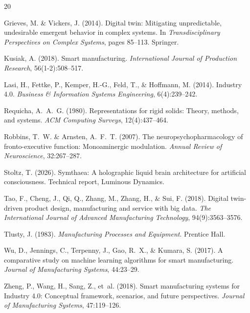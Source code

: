 \documentclass[11pt,a4paper]{article}
\begin{document}

\begin{thebibliography}{20}

Grieves, M. \& Vickers, J. (2014).
\newblock Digital twin: Mitigating unpredictable, undesirable emergent behavior in complex systems.
\newblock In \emph{Transdisciplinary Perspectives on Complex Systems}, pages 85--113. Springer.

Kusiak, A. (2018).
\newblock Smart manufacturing.
\newblock \emph{International Journal of Production Research}, 56(1-2):508--517.

Lasi, H., Fettke, P., Kemper, H.-G., Feld, T., \& Hoffmann, M. (2014).
\newblock Industry 4.0.
\newblock \emph{Business \& Information Systems Engineering}, 6(4):239--242.

Requicha, A.~A.~G. (1980).
\newblock Representations for rigid solids: Theory, methods, and systems.
\newblock \emph{ACM Computing Surveys}, 12(4):437--464.

Robbins, T.~W. \& Arnsten, A.~F.~T. (2007).
\newblock The neuropsychopharmacology of fronto-executive function: Monoaminergic modulation.
\newblock \emph{Annual Review of Neuroscience}, 32:267--287.

Stoltz, T. (2026).
\newblock Symthaea: A holographic liquid brain architecture for artificial consciousness.
\newblock Technical report, Luminous Dynamics.

Tao, F., Cheng, J., Qi, Q., Zhang, M., Zhang, H., \& Sui, F. (2018).
\newblock Digital twin-driven product design, manufacturing and service with big data.
\newblock \emph{The International Journal of Advanced Manufacturing Technology}, 94(9):3563--3576.

Tlusty, J. (1983).
\newblock \emph{Manufacturing Processes and Equipment}.
\newblock Prentice Hall.

Wu, D., Jennings, C., Terpenny, J., Gao, R.~X., \& Kumara, S. (2017).
\newblock A comparative study on machine learning algorithms for smart manufacturing.
\newblock \emph{Journal of Manufacturing Systems}, 44:23--29.

Zheng, P., Wang, H., Sang, Z., et~al. (2018).
\newblock Smart manufacturing systems for Industry 4.0: Conceptual framework, scenarios, and future perspectives.
\newblock \emph{Journal of Manufacturing Systems}, 47:119--126.

\end{thebibliography}
\end{document}
